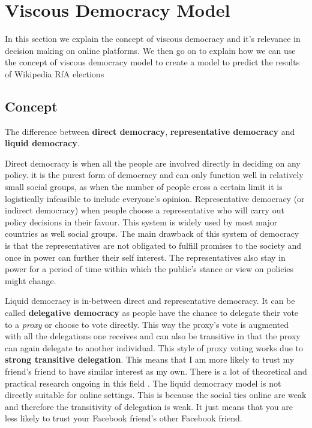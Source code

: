 \section{Viscous Democracy Model}
\label{sec:model}
In this section we explain the concept of viscous democracy \cite{ViscousDemocracy} and it's relevance in decision making on online platforms. We then go on to explain how we can use the concept of viscous democracy model to create a model to predict the results of Wikipedia RfA elections

\subsection{Concept}
The difference between \textbf{direct democracy}, \textbf{representative democracy} and \textbf{liquid democracy}.

Direct democracy is when all the people are involved directly in deciding on any policy. it is the purest form of democracy and can only function well in relatively small social groups, as when the number of people cross a certain limit it is logistically infeasible to include everyone's opinion. Representative democracy (or indirect democracy) when people choose a representative who will carry out policy decisions in their favour. This system is widely used by most major countries as well social groups. The main drawback of this system of democracy is that the representatives are not obligated to fulfill promises to the society and once in power can further their self interest. The representatives also stay in power for a period of time within which the public's stance or view on policies might change.

Liquid democracy is in-between direct and representative democracy. It can be called \textbf{delegative democracy} as people have the chance to delegate their vote to a \textit{proxy} or choose to vote directly. This way the proxy's vote is augmented with all the delegations one receives and can also be transitive in that the proxy can again delegate to another individual. This style of proxy voting works due to \textbf{strong transitive delegation}. This means that I am more likely to trust my friend's friend to have similar interest as my own. There is a lot of theoretical and practical research ongoing in this field \cite{kahng2018liquid,hardt2015google}. The liquid democracy model is not directly suitable for online settings. This is because the social ties online are weak and therefore the transitivity of delegation is weak. It just means that you are less likely to trust your Facebook friend's other Facebook friend. 

